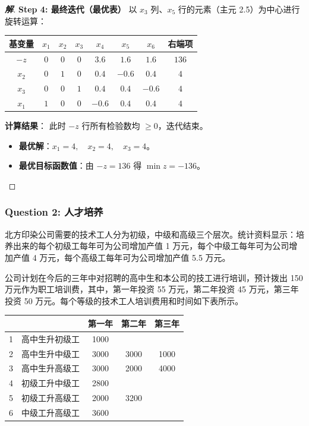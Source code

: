 \documentclass[a4paper,12pt]{ctexart} %
\newenvironment{solution}{\begin{proof}[\textbf{解}]}{\end{proof}}
\begin{document}
\begin{solution}
		\textbf{Step 4: 最终迭代（最优表）}
		以 $x_3$ 列、$x_5$ 行的元素（主元 2.5）为中心进行旋转运算：
		
		\begin{table}[H]
			\centering
			\renewcommand{\arraystretch}{1.3}
			\begin{tabular}{c|cccccc|c}
				\toprule
				\textbf{基变量} & $x_1$ & $x_2$ & $x_3$ & $x_4$ & $x_5$ & $x_6$ & \textbf{右端项} \\
				\hline
				$-z$ & $0$ & $0$ & $0$ & $3.6$ & $1.6$ & $1.6$ & $136$ \\
				\hline
				$x_2$ & $0$ & $1$ & $0$ & $0.4$ & $-0.6$ & $0.4$ & $4$ \\
				$x_3$ & $0$ & $0$ & $1$ & $0.4$ & $0.4$ & $-0.6$ & $4$ \\
				$x_1$ & $1$ & $0$ & $0$ & $-0.6$ & $0.4$ & $0.4$ & $4$ \\
				\bottomrule
			\end{tabular}
		\end{table}
		
		\textbf{计算结果}：
		此时 $-z$ 行所有检验数均 $\ge 0$，迭代结束。
		\begin{itemize}
			\item \textbf{最优解}：$x_1=4, \quad x_2=4, \quad x_3=4$。
			\item \textbf{最优目标函数值}：由 $-z = 136$ 得 $\min z = -136$。
		\end{itemize}
	\end{solution}
	
	\subsubsection*{Question 2: 人才培养}
	
	北方印染公司需要的技术工人分为初级，中级和高级三个层次。统计资料显示：培养出来的每个初级工每年可为公司增加产值 1 万元，每个中级工每年可为公司增加产值 4 万元，每个高级工每年可为公司增加产值 5.5 万元。
	
	公司计划在今后的三年中对招聘的高中生和本公司的技工进行培训，预计拨出 150 万元作为职工培训费，其中，第一年投资 55 万元，第二年投资 45 万元，第三年投资 50 万元。每个等级的技术工人培训费用和时间如下表所示。
	
	\begin{table}[h!]
		\centering
		\begin{tabular}{|c|l|c|c|c|}
			\hline
			& & 第一年 & 第二年 & 第三年 \\ \hline
			1 & 高中生升初级工 & 1000 & & \\ \hline
			2 & 高中生升中级工 & 3000 & 3000 & 1000 \\ \hline
			3 & 高中生升高级工 & 3000 & 2000 & 4000 \\ \hline
			4 & 初级工升中级工 & 2800 & & \\ \hline
			5 & 初级工升高级工 & 2000 & 3200 & \\ \hline
			6 & 中级工升高级工 & 3600 & & \\ \hline
		\end{tabular}
	\end{table}
	
\end{document}
